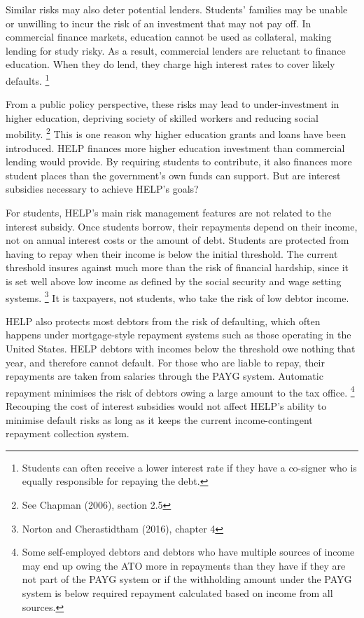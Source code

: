 \documentclass[embargoed]{grattan}
\begin{document}
Similar risks may also deter potential lenders.
Students' families may be unable or unwilling to incur the risk of an investment that may not pay off.
In commercial finance markets, education cannot be used as collateral, making lending for study risky.
As a result, commercial lenders are reluctant to finance education.
When they do lend, they charge high interest rates to cover likely defaults.%
\footnote{Students can often receive a lower interest rate if they have a co-signer who is equally responsible for repaying the debt.}

From a public policy perspective, these risks may lead to under-investment in higher education, depriving society of skilled workers and reducing social mobility.%
\footnote{See Chapman (2006), section 2.5} This is one reason why higher education grants and loans have been introduced.
\gls{HELP} finances more higher education investment than commercial lending would provide.
By requiring students to contribute, it also finances more student places than the government's own funds can support.
But are interest subsidies necessary to achieve \gls{HELP}'s goals?

For students, \gls{HELP}'s main risk management features are not related to the interest subsidy.
Once students borrow, their repayments depend on their income, not on annual interest costs or the amount of debt.
Students are protected from having to repay when their income is below the initial threshold.
The current threshold insures against much more than the risk of financial hardship, since it is set well above low income as defined by the social security and wage setting systems.%
\footnote{Norton and Cherastidtham (2016), chapter 4} It is taxpayers, not students, who take the risk of low debtor income.

\gls{HELP} also protects most debtors from the risk of defaulting, which often happens under mortgage-style repayment systems such as those operating in the United States.
\gls{HELP} debtors with incomes below the threshold owe nothing that year, and therefore cannot default.
For those who are liable to repay, their repayments are taken from salaries through the \gls{PAYG} system.
Automatic repayment minimises the risk of debtors owing a large amount to the tax office.%
\footnote{Some self-employed debtors and debtors who have multiple sources of income may end up owing the \gls{ATO} more in repayments than they have if they are not part of the \gls{PAYG} system or if the withholding amount under the \gls{PAYG} system is below required repayment calculated based on income from all sources.} Recouping the cost of interest subsidies would not affect \gls{HELP}'s ability to minimise default risks as long as it keeps the current income-contingent repayment collection system.
\end{document}
